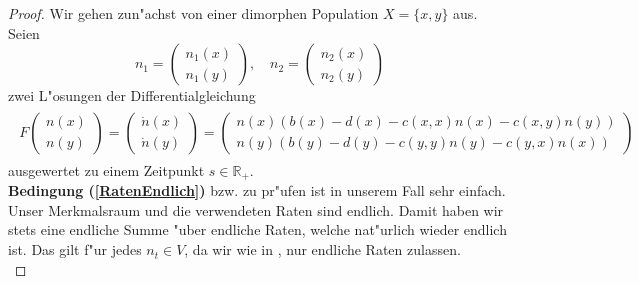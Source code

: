 \documentclass[11pt, a4paper, german]{article}
\theoremstyle{plain}
\newcommand{\tvec}[2]{\begin{pmatrix}#1\\#2\end{pmatrix}}
\begin{document}
	\begin{proof}
		Wir gehen zun"achst von einer dimorphen Population $ X = \{x,y\} $ aus. Seien
		\[ n_1 = \tvec{n_1(x)}{n_1(y)}, \quad n_2 = \tvec{n_2(x)}{n_2(y)} \]
		zwei L"osungen der Differentialgleichung
		\begin{align}
		\begin{split}
		F\tvec{n(x)}{n(y)} = \tvec{\dot{n}(x)}{\dot{n}(y)} =  \tvec{n(x)(b(x)-d(x)-c(x,x)n(x)-c(x,y)n(y))}{n(y)(b(y)-d(y)-c(y,y)n(y)-c(y,x)n(x))}\label{nDGL}
		\end{split}
		\end{align}
		ausgewertet zu einem Zeitpunkt $ s \in \mathbb{R}_{+} $.\\

		\textbf{Bedingung (\ref{RatenEndlich})} bzw. \cite[Kapitel 11 - \textbf{Thm 2.1} (2.6)]{ethier2009markov} zu pr"ufen ist in unserem Fall sehr einfach.
		Unser Merkmalsraum und die verwendeten Raten sind endlich. Damit haben wir stets eine endliche Summe "uber endliche Raten, welche nat"urlich wieder endlich ist. Das gilt f"ur jedes $ n_t \in V $, da wir wie in \cite{fournier2004microscopic}, nur endliche Raten zulassen.\\


\end{proof}
\end{document}
